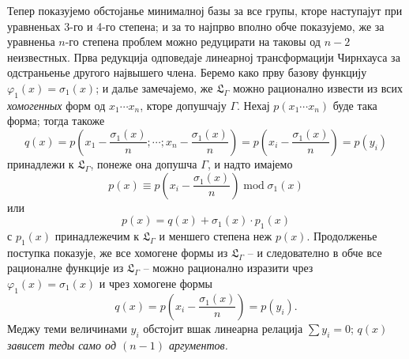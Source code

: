 ﻿\documentclass[11pt]{article}
\begin{document}
Тепер показујемо обстојанье минималној базы за все групы, кторе наступајут при уравненьах 3-го и 4-го степена; и за то најпрво вполно обче показујемо, же за уравненьа $n$-го степена проблем можно редуцирати на таковы од $n-2$ неизвестных. Прва редукција одповедаје линеарној трансформацији Чирнхауса за одстраньенье другого највышего члена. Беремо како прву базову функцију $\varphi_1(x)=\sigma_1(x)$; и далье замечајемо, же $\mathfrak L_\Gamma$ можно рационално извести из всих {\itshape хомогенных} форм од $x_1\cdots x_n$, кторе допушчају $\Gamma$. Нехај $p(x_1\cdots x_n)$ буде така форма; тогда такоже
\[
q(x)=p\left(x_1-\frac{\sigma_1(x)}{n};\cdots;x_n-\frac{\sigma_1(x)}{n}\right)=p\left(x_i-\frac{\sigma_1(x)}{n}\right)=p(y_i)
\]
принадлежи к $\mathfrak L_\Gamma$, понеже она допушча $\Gamma$, и надто имајемо
\[
p(x)\equiv p\left(x_i-\frac{\sigma_1(x)}{n}\right)\operatorname{mod}\sigma_1(x)
\]
или
\[
p(x)=q(x)+\sigma_1(x)\cdot p_1(x)
\]
с $p_1(x)$ принадлежечим к $\mathfrak L_\Gamma$ и меншего степена неж $p(x)$. Продолженье поступка показује, же все хомогене формы из $\mathfrak L_\Gamma$ -- и следователно в обче все рационалне функције из $\mathfrak L_\Gamma$ -- можно рационално изразити чрез $\varphi_1(x)=\sigma_1(x)$ и чрез хомогене формы
\[
q(x)=p\left(x_i-\frac{\sigma_1(x)}{n}\right)=p(y_i).
\]
Меджу теми величинами $y_i$ обстојит вшак линеарна релација $\sum y_i=0$; $q(x)$ {\itshape зависет теды само од $(n-1)$ аргументов.}
\end{document}
